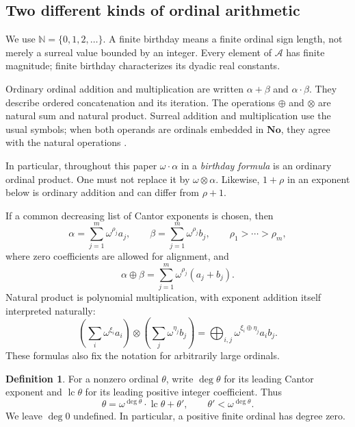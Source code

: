 \documentclass[11pt,letterpaper]{article}
\theoremstyle{definition}
\newtheorem{definition}[theorem]{Definition}
\theoremstyle{remark}
\newcommand{\No}{\mathbf{No}}
\newcommand{\N}{\mathbb{N}}
\newcommand{\A}{\mathscr{A}}
\newcommand{\ns}{\mathbin{\oplus}}
\newcommand{\np}{\mathbin{\otimes}}
\DeclareMathOperator{\lc}{lc}
\begin{document}
\subsection{Two different kinds of ordinal arithmetic}
We use \(\N=\{0,1,2,\ldots\}\). A finite birthday means a finite
ordinal sign length, not merely a surreal value bounded by an integer.
Every element of \(\A\) has finite magnitude; finite birthday
characterizes its dyadic real constants.

Ordinary ordinal addition and multiplication are written \(\alpha+\beta\)
and \(\alpha\cdot\beta\). They describe ordered concatenation and its
iteration. The operations \(\ns\) and \(\np\) are natural sum and
natural product. Surreal addition and multiplication use the usual symbols;
when both operands are ordinals embedded in \(\No\), they agree with the
natural operations \cite[Section~6]{Berarducci}.

In particular, throughout this paper \(\omega\cdot\alpha\) in a
\emph{birthday formula} is an ordinary ordinal product. One must not replace
it by \(\omega\np\alpha\). Likewise, \(1+\rho\) in an exponent below
is ordinary addition and can differ from \(\rho+1\).

If a common decreasing list of Cantor exponents is chosen, then
\[
 \alpha=\sum_{j=1}^m\omega^{\rho_j}a_j,
 \qquad
 \beta=\sum_{j=1}^m\omega^{\rho_j}b_j,
 \qquad \rho_1>\cdots>\rho_m,
\]
where zero coefficients are allowed for alignment, and
\begin{equation}\label{eq:natural-sum}
 \alpha\ns\beta=\sum_{j=1}^m\omega^{\rho_j}(a_j+b_j).
\end{equation}
Natural product is polynomial multiplication, with exponent addition
itself interpreted naturally:
\begin{equation}\label{eq:natural-product}
 \left(\sum_i\omega^{\xi_i}a_i\right)
 \np\left(\sum_j\omega^{\eta_j}b_j\right)
 =\mathop{\bigoplus}_{i,j}\omega^{\xi_i\ns\eta_j}a_i b_j.
\end{equation}
These formulas also fix the notation for arbitrarily large ordinals.

\begin{definition}
For a nonzero ordinal \(\theta\), write \(\deg\theta\) for its leading
Cantor exponent and \(\lc\theta\) for its leading positive integer
coefficient. Thus
\[
 \theta=\omega^{\deg\theta}\cdot\lc\theta+\theta',
 \qquad \theta'<\omega^{\deg\theta}.
\]
We leave \(\deg0\) undefined. In particular, a positive finite ordinal
has degree zero.
\end{definition}
\end{document}
